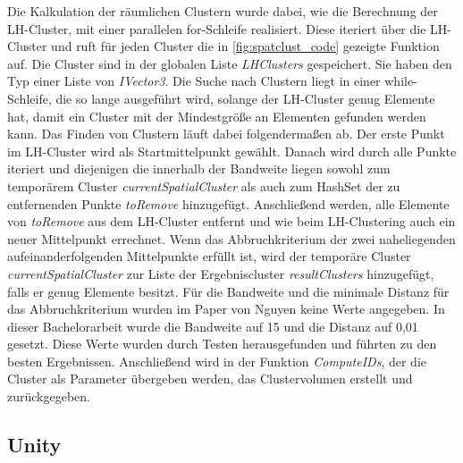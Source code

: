 Die Kalkulation der räumlichen Clustern wurde dabei, wie die Berechnung der LH-Cluster, mit einer parallelen for-Schleife realisiert. Diese iteriert über die LH-Cluster und ruft für jeden Cluster die in \autoref{fig:spatclust_code} gezeigte Funktion auf. Die Cluster sind in der globalen Liste \textit{LHClusters} gespeichert. Sie haben den Typ einer Liste von \textit{IVector3}. 
\newline
Die Suche nach Clustern liegt in einer while-Schleife, die so lange ausgeführt wird, solange der LH-Cluster genug Elemente hat, damit ein Cluster mit der Mindestgröße an Elementen gefunden werden kann. 
\newline
Das Finden von Clustern läuft dabei folgendermaßen ab. Der erste Punkt im LH-Cluster wird als Startmittelpunkt gewählt. Danach wird durch alle Punkte iteriert und diejenigen die innerhalb der Bandweite liegen sowohl zum temporärem Cluster \textit{currentSpatialCluster} als auch zum HashSet der zu entfernenden Punkte \textit{toRemove} hinzugefügt. Anschließend werden, alle Elemente von \textit{toRemove} aus dem LH-Cluster entfernt und wie beim LH-Clustering auch ein neuer Mittelpunkt errechnet. Wenn das Abbruchkriterium der zwei naheliegenden aufeinanderfolgenden Mittelpunkte erfüllt ist, wird der temporäre Cluster \textit{currentSpatialCluster} zur Liste der Ergebniscluster \textit{resultClusters} hinzugefügt, falls er genug Elemente besitzt.
\newline
Für die Bandweite und die minimale Distanz für das Abbruchkriterium wurden im Paper von Nguyen \cite{nguyen2012clustering} keine Werte angegeben. In dieser Bachelorarbeit wurde die Bandweite auf 15 und die Distanz auf 0,01 gesetzt. Diese Werte wurden durch Testen herausgefunden und führten zu den besten Ergebnissen.
\newline
Anschließend wird in der Funktion \textit{ComputeIDs}, der die Cluster als Parameter übergeben werden, das Clustervolumen erstellt und zurückgegeben.



\subsection{Unity}

